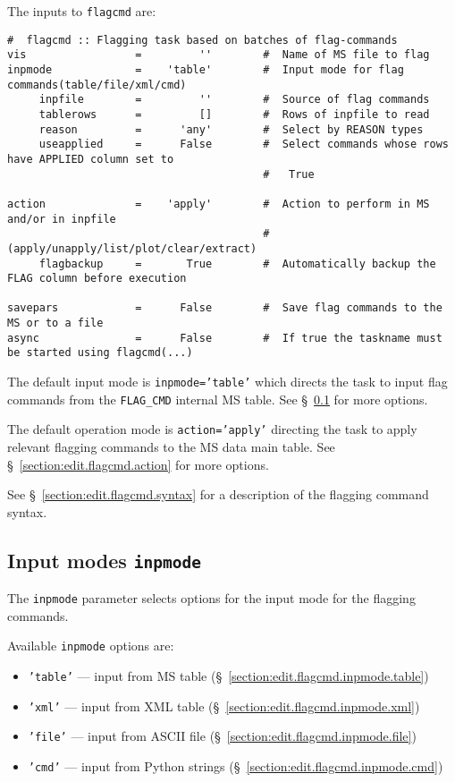 The inputs to {\tt flagcmd} are:
\small
\begin{verbatim}
#  flagcmd :: Flagging task based on batches of flag-commands
vis                 =         ''        #  Name of MS file to flag
inpmode             =    'table'        #  Input mode for flag commands(table/file/xml/cmd)
     inpfile        =         ''        #  Source of flag commands
     tablerows      =         []        #  Rows of inpfile to read
     reason         =      'any'        #  Select by REASON types
     useapplied     =      False        #  Select commands whose rows have APPLIED column set to
                                        #   True

action              =    'apply'        #  Action to perform in MS and/or in inpfile
                                        #   (apply/unapply/list/plot/clear/extract)
     flagbackup     =       True        #  Automatically backup the FLAG column before execution

savepars            =      False        #  Save flag commands to the MS or to a file
async               =      False        #  If true the taskname must be started using flagcmd(...)
\end{verbatim}
\normalsize

The default input mode is {\tt inpmode='table'} which directs the
task to input flag commands from the {\tt FLAG\_CMD} internal MS
table. See \S~\ref{section:edit.flagcmd.inpmode} for more options.

The default operation mode is {\tt action='apply'} directing the
task to apply relevant flagging commands to the MS data main table.
See \S~\ref{section:edit.flagcmd.action} for more options.

See \S~\ref{section:edit.flagcmd.syntax} for a description of the
flagging command syntax.

\subsection{Input modes {\tt inpmode}}
\label{section:edit.flagcmd.inpmode}

The {\tt inpmode} parameter selects options for the input mode for
the flagging commands.

Available {\tt inpmode} options are:
\begin{itemize}
   \item {\tt 'table'} --- input from MS table (\S~\ref{section:edit.flagcmd.inpmode.table})
   \item {\tt 'xml'} --- input from XML table (\S~\ref{section:edit.flagcmd.inpmode.xml})
   \item {\tt 'file'} --- input from ASCII file (\S~\ref{section:edit.flagcmd.inpmode.file})
   \item {\tt 'cmd'} --- input from Python strings (\S~\ref{section:edit.flagcmd.inpmode.cmd})
\end{itemize}

